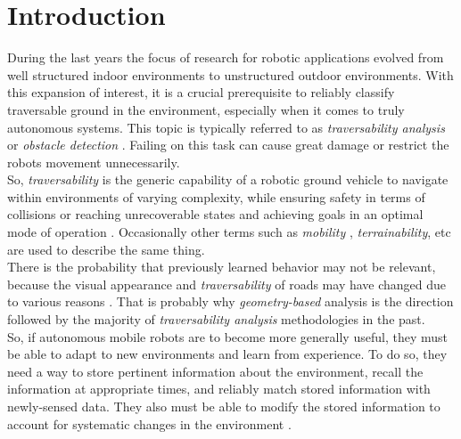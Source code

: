 \documentclass[12pt,a4paper]{report}
\newcommand{\term}{\textit}
\begin{document}
	{
		\hypersetup{linkcolor=black}
		\tableofcontents
	}
	
	\chapter{Introduction}
	\label{sec:intro}
	
	During the last years the focus of research for robotic applications evolved 
	from well structured indoor environments to unstructured outdoor environments. 
	With this expansion of interest, it is a crucial prerequisite to reliably 
	classify traversable ground in the environment, especially when it comes to 
	truly autonomous systems. This topic is typically referred to as 
	\term{traversability analysis} or \term{obstacle detection} \cite{Suger}. 
	Failing on this	task can cause great damage or restrict the robots movement 
	unnecessarily.
	\\
	
	So, \term{traversability} is the generic capability of a robotic ground 
	vehicle to navigate within environments of varying complexity, while ensuring 
	safety in terms of collisions or reaching unrecoverable states and achieving 
	goals in an optimal mode of operation \cite{Papadakis}. Occasionally other 
	terms such as \term{mobility} \cite{Lalonde}, \term{terrainability}, etc are 
	used to describe the same thing.
	\\
		
	There is the probability that previously learned behavior may not be relevant, 
	because the visual appearance and \term{traversability} of roads may have 
	changed due to various reasons \cite{Wigness}. That is probably why 
	\term{geometry-based} analysis is the direction followed by the majority of 
	\term{traversability analysis} methodologies in the past\cite{Papadakis}.
	\\
	
	So, if autonomous mobile robots are to become more generally useful, they must 
	be able to adapt to new environments and learn from experience. To do so, they 
	need a way to store pertinent information about the environment, recall the 
	information at appropriate times, and reliably match stored information with 
	newly-sensed data. They also must be able to modify the stored information to 
	account for systematic changes in the environment \cite{Shneier}.
	\\
	
\end{document}
